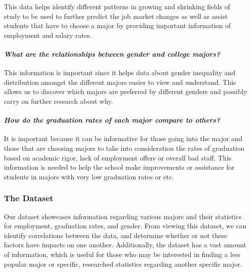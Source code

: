 \documentclass[
]{article}
\begin{document}
This data helps identify different patterns in growing and shrinking
fields of study to be used to further predict the job market changes as
well as assist students that have to choose a major by providing
important information of employment and salary rates.

\hypertarget{what-are-the-relationships-between-gender-and-college-majors}{%
\paragraph{\texorpdfstring{\emph{What are the relationships between
gender and college
majors?}}{What are the relationships between gender and college majors?}}\label{what-are-the-relationships-between-gender-and-college-majors}}

This information is important since it helps data about gender
inequality and distribution amongst the different majors easier to view
and understand. This allows us to discover which majors are preferred by
different genders and possibly carry on further research about why.

\hypertarget{how-do-the-graduation-rates-of-each-major-compare-to-others}{%
\paragraph{\texorpdfstring{\emph{How do the graduation rates of each
major compare to
others?}}{How do the graduation rates of each major compare to others?}}\label{how-do-the-graduation-rates-of-each-major-compare-to-others}}

It is important because it can be informative for those going into the
major and those that are choosing majors to take into consideration the
rates of graduation based on academic rigor, lack of employment offers
or overall bad staff. This information is needed to help the school make
improvements or assistance for students in majors with very low
graduation rates or etc.

\hypertarget{the-dataset}{%
\subsubsection{The Dataset}\label{the-dataset}}

Our dataset showcases information regarding various majors and their
statistics for employment, graduation rates, and gender. From viewing
this dataset, we can identify correlations between the data, and
determine whether or not these factors have impacts on one another.
Additionally, the dataset has a vast amount of information, which is
useful for those who may be interested in finding a less popular major
or specific, researched statistics regarding another specific major.
\end{document}
